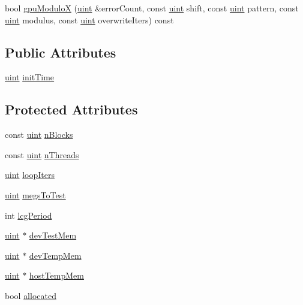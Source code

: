 \begin{DoxyCompactItemize}
\item 
bool \hyperlink{classmemtestState_aee1981ddbaf7d1f2e5529f52282373cd}{gpu\-Modulo\-X} (\hyperlink{memtestG80__core_8h_a91ad9478d81a7aaf2593e8d9c3d06a14}{uint} \&error\-Count, const \hyperlink{memtestG80__core_8h_a91ad9478d81a7aaf2593e8d9c3d06a14}{uint} shift, const \hyperlink{memtestG80__core_8h_a91ad9478d81a7aaf2593e8d9c3d06a14}{uint} pattern, const \hyperlink{memtestG80__core_8h_a91ad9478d81a7aaf2593e8d9c3d06a14}{uint} modulus, const \hyperlink{memtestG80__core_8h_a91ad9478d81a7aaf2593e8d9c3d06a14}{uint} overwrite\-Iters) const 
\end{DoxyCompactItemize}
\subsection*{\-Public \-Attributes}
\begin{DoxyCompactItemize}
\item 
\hyperlink{memtestG80__core_8h_a91ad9478d81a7aaf2593e8d9c3d06a14}{uint} \hyperlink{classmemtestState_abc96427b4619546e5458ac5294cc8f2f}{init\-Time}
\end{DoxyCompactItemize}
\subsection*{\-Protected \-Attributes}
\begin{DoxyCompactItemize}
\item 
const \hyperlink{memtestG80__core_8h_a91ad9478d81a7aaf2593e8d9c3d06a14}{uint} \hyperlink{classmemtestState_a665bc9994284e440c64f92b9663f0be2}{n\-Blocks}
\item 
const \hyperlink{memtestG80__core_8h_a91ad9478d81a7aaf2593e8d9c3d06a14}{uint} \hyperlink{classmemtestState_a15859b1ffa8a2b2b8008cf9570987c37}{n\-Threads}
\item 
\hyperlink{memtestG80__core_8h_a91ad9478d81a7aaf2593e8d9c3d06a14}{uint} \hyperlink{classmemtestState_a8388ecc3506a28f1efe3ef7cd6062e37}{loop\-Iters}
\item 
\hyperlink{memtestG80__core_8h_a91ad9478d81a7aaf2593e8d9c3d06a14}{uint} \hyperlink{classmemtestState_a4fe7ab54b5238cb94e4e0b7277c4a8fb}{megs\-To\-Test}
\item 
int \hyperlink{classmemtestState_a0ff5f92181de32afc19df406ff7d3cdb}{lcg\-Period}
\item 
\hyperlink{memtestG80__core_8h_a91ad9478d81a7aaf2593e8d9c3d06a14}{uint} $\ast$ \hyperlink{classmemtestState_a781ea31469b78772ff8abc4db44b6cbc}{dev\-Test\-Mem}
\item 
\hyperlink{memtestG80__core_8h_a91ad9478d81a7aaf2593e8d9c3d06a14}{uint} $\ast$ \hyperlink{classmemtestState_abea6c99f29b5b87ad9fa98362e0140bf}{dev\-Temp\-Mem}
\item 
\hyperlink{memtestG80__core_8h_a91ad9478d81a7aaf2593e8d9c3d06a14}{uint} $\ast$ \hyperlink{classmemtestState_a48818d36677ce3b7b8a3d32c78a22691}{host\-Temp\-Mem}
\item 
bool \hyperlink{classmemtestState_aa9769c68e173642ff830c7e2e02333b0}{allocated}
\end{DoxyCompactItemize}


